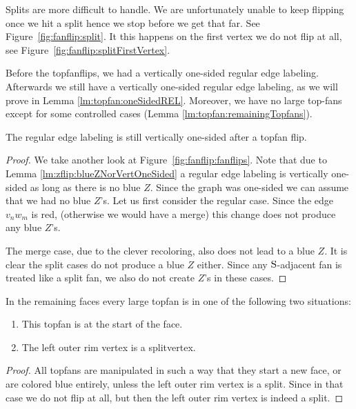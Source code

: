   Splits are more difficult to handle. We are unfortunately unable to keep flipping once we hit a split hence we stop before we get that far. See Figure~\ref{fig:fanflip:split}. It this happens on the first vertex we do not flip at all, see Figure~\ref{fig:fanflip:splitFirstVertex}.

  Before the topfanflips, we had a vertically one-sided regular edge labeling. Afterwards we still have a vertically one-sided regular edge labeling, as we will prove in Lemma \ref{lm:topfan:oneSidedREL}. Moreover, we have no large top-fans except for some controlled cases (Lemma \ref{lm:topfan:remainingTopfans}).

  \begin{lemma}
    \label{lm:topfan:oneSidedREL}
    The regular edge labeling is still vertically one-sided after a topfan flip.
  \end{lemma}
  \begin{proof}
    We take another look at Figure~\ref{fig:fanflip:fanflips}. Note that due to Lemma \ref{lm:zflip:blueZNorVertOneSided} a regular edge labeling is vertically one-sided as long as there is no blue $Z$.  Since the graph was one-sided we can assume that we had no blue $Z$'s.
    Let us first consider the regular case. Since the edge  $v_n w_m$ is red, (otherwise we would have a merge) this change does not produce any blue $Z$'s.

    The merge case, due to the clever recoloring, also does not lead to a blue $Z$.
    It is clear the split cases do not produce a blue $Z$ either.
    Since any $\mathrm{S}$-adjacent fan is treated like a split fan, we also do not create $Z$'s in these cases.
  \end{proof}
\pagebreak[2]

\begin{lemma}
  \label{lm:topfan:remainingTopfans}
  In the remaining faces every large topfan is in one of the following two situations:
  \begin{enumerate}
    \item  This topfan is at the start of the face.
    \item  The left outer rim vertex is a splitvertex.
  \end{enumerate}
\end{lemma}
\begin{proof}
  All topfans are manipulated in such a way that they start a new face, or are colored blue entirely, unless the left outer rim vertex is a split. Since in that case we do not flip at all, but then the left outer rim vertex is indeed a split.
\end{proof}
